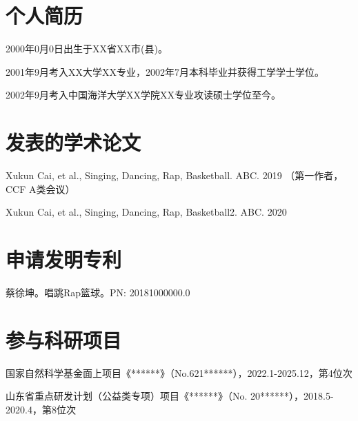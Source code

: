 \documentclass[pdf]{oucthesis}
\begin{document}
\begin{profile}
\section*{个人简历}

2000年0月0日出生于XX省XX市(县)。

2001年9月考入XX大学XX专业，2002年7月本科毕业并获得工学学士学位。

2002年9月考入中国海洋大学XX学院XX专业攻读硕士学位至今。

\section*{发表的学术论文}
\noindent[1] Xukun Cai, et al., Singing, Dancing, Rap, Basketball. ABC. 2019 （第一作者，CCF A类会议）

\noindent[2] Xukun Cai, et al., Singing, Dancing, Rap, Basketball2. ABC. 2020


\section*{申请发明专利}  

\noindent[1]蔡徐坤。唱跳Rap篮球。PN: 20181000000.0

%
\section*{参与科研项目}  

\noindent[1] 国家自然科学基金面上项目《******》（No.621******），2022.1-2025.12，第4位次

\noindent[2] 山东省重点研发计划（公益类专项）项目《******》（No. 20******），2018.5-2020.4，第8位次


\end{profile}
\end{document}
